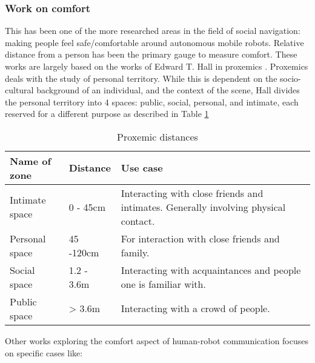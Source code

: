 \subsubsection{Work on comfort}
This has been one of the more researched areas in the field of social navigation: making people feel safe/comfortable around autonomous mobile robots. Relative distance from a person has been the primary gauge to measure comfort. These works are largely based on the works of Edward T. Hall in proxemics \cite{proxemics_hall_1968}. Proxemics deals with the study of personal territory. While this is dependent on the socio-cultural background of an individual, and the context of the scene, Hall divides the personal territory into 4 spaces: public, social, personal, and intimate, each reserved for a different purpose as described in Table \ref{tab:proxemics}
\begin{table}
    \label{tab:proxemics}
    \caption{Proxemic distances}
    \begin{center}
        \renewcommand{\arraystretch}{1.3}
        \begin{tabular}{|p{}|p{}|p{}|}
            \hline
            Name of zone & Distance & Use case \\
            \hline\hline
            Intimate space & 0 - 45cm &  Interacting with close friends and intimates. Generally involving physical contact.\\
            Personal space & 45 -120cm &  For interaction with close friends and family. \\
            Social space & 1.2 - 3.6m &  Interacting with acquaintances and people one is familiar with.\\
            Public space & > 3.6m &  Interacting with a crowd of people.\\
            \hline
        \end{tabular}
    \end{center}
\end{table}
Other works exploring the comfort aspect of human-robot communication focuses on specific cases like:

